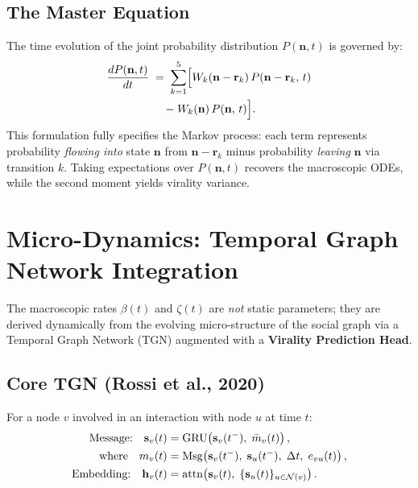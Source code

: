 \documentclass[11pt]{article}
\newcommand{\hv}{\mathbf{h}}
\newcommand{\bn}{\mathbf{n}}
\newcommand{\br}{\mathbf{r}}
\newcommand{\bs}{\mathbf{s}}
\newcommand{\cN}{\mathcal{N}}
\begin{document}
\subsection{The Master Equation}

The time evolution of the joint probability distribution $P(\bn, t)$ is governed
by:
\begin{multline}
  \frac{dP(\bn, t)}{dt}
  \;=\;
  \sum_{k=1}^{5}
  \Bigl[
    W_k(\bn - \br_k)\,P(\bn - \br_k,\, t) \\
    \;-\;
    W_k(\bn)\,P(\bn,\, t)
  \Bigr].
  \label{eq:master}
\end{multline}
This formulation fully specifies the Markov process: each term represents
probability \emph{flowing into} state $\bn$ from $\bn - \br_k$ minus probability
\emph{leaving} $\bn$ via transition $k$. Taking expectations over $P(\bn, t)$
recovers the macroscopic ODEs, while the second moment yields virality variance.

\section{Micro-Dynamics: Temporal Graph Network Integration}
\label{sec:tgn}

The macroscopic rates $\beta(t)$ and $\zeta(t)$ are \emph{not} static parameters;
they are derived dynamically from the evolving micro-structure of the social
graph via a Temporal Graph Network (TGN) augmented with a
\textbf{Virality Prediction Head}.

\subsection{Core TGN (Rossi et al., 2020)}

For a node $v$ involved in an interaction with node $u$ at time $t$:
\begin{align}
  \text{Message:} \quad
    \bs_v(t) &= \mathrm{GRU}\!\left(\bs_v(t^-),\;
               \bar{m}_v(t)\right), \label{eq:tgn-mem}\\
  \text{where} \quad
    m_v(t) &= \mathrm{Msg}\!\left(\bs_v(t^-),\;\bs_u(t^-),\;
              \Delta t,\; e_{vu}(t)\right), \notag\\
  \text{Embedding:} \quad
    \hv_v(t) &= \mathrm{attn}\!\left(\bs_v(t),\;
               \{\bs_u(t)\}_{u\in\cN(v)}\right). \label{eq:tgn-emb}
\end{align}
\end{document}
